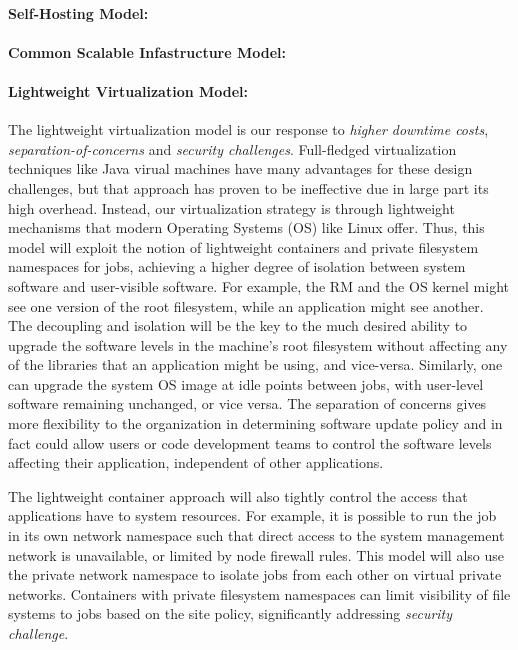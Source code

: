 \documentclass{article}
\begin{document}
\paragraph{Self-Hosting Model:}


\paragraph{Common Scalable Infastructure Model:}


\paragraph{Lightweight Virtualization Model:}
The lightweight virtualization model is our response to {\sl higher downtime costs}, 
{\sl separation-of-concerns} and {\sl security challenges}. 
Full-fledged virtualization techniques like Java virual machines have many advantages
for these design challenges, but that approach has proven to be ineffective due in large
part its high overhead. Instead, our virtualization strategy is through lightweight
mechanisms that modern Operating Systems (OS) like Linux offer. 
Thus, this model will exploit the notion of lightweight containers
and private filesystem namespaces for jobs, achieving
a higher degree of isolation between system software and user-visible
software. For example, the RM and the OS
kernel might see one version of the root filesystem, while an application
might see another. The decoupling and isolation will be the key to the
much desired ability to upgrade the software levels in the machine's
root filesystem without affecting any of the
libraries that an application might be using, and vice-versa.
Similarly, one can upgrade the system OS image at idle points between jobs,
with user-level software remaining unchanged, or vice versa. The separation of
concerns gives more flexibility to the organization in determining software
update policy and in fact could allow users or code development teams to
control the software levels affecting their application, independent of
other applications.


The lightweight container approach will also tightly control the access that
applications have to system resources. For example, it is possible to
run the job in its own network namespace such that direct access to the
system management network is unavailable, or limited by node firewall
rules. This model will  also use the private network namespace to isolate
jobs from each other on virtual private networks.
Containers with private filesystem namespaces can limit visibility of
file systems to jobs based on the site policy, significantly addressing
{\sl security challenge}.
\end{document}
